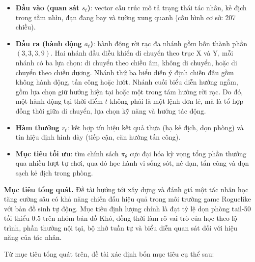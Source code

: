 \begin{itemize}
    \item \textbf{Đầu vào (quan sát $s_t$)}: vector cấu trúc mô tả trạng thái tác nhân, kẻ địch trong tầm nhìn, đạn đang bay và tường xung quanh (cấu hình cơ sở: 207 chiều).
    \item \textbf{Đầu ra (hành động $a_t$)}: hành động rời rạc đa nhánh gồm bốn thành phần $(3,3,3,9)$. Hai nhánh đầu điều khiển di chuyển theo trục X và Y, mỗi nhánh có ba lựa chọn: di chuyển theo chiều âm, không di chuyển, hoặc di chuyển theo chiều dương. Nhánh thứ ba biểu diễn ý định chiến đấu gồm không hành động, tấn công hoặc lướt. Nhánh cuối biểu diễn hướng ngắm, gồm lựa chọn giữ hướng hiện tại hoặc một trong tám hướng rời rạc. Do đó, một hành động tại thời điểm $t$ không phải là một lệnh đơn lẻ, mà là tổ hợp đồng thời giữa di chuyển, lựa chọn kỹ năng và hướng tác động.
    \item \textbf{Hàm thưởng $r_t$}: kết hợp tín hiệu kết quả thưa (hạ kẻ địch, dọn phòng) và tín hiệu định hình dày (tiếp cận, căn hướng tấn công).
    \item \textbf{Mục tiêu tối ưu}: tìm chính sách $\pi_\theta$ cực đại hóa kỳ vọng tổng phần thưởng qua nhiều lượt tự chơi, qua đó học hành vi sống sót, né đạn, tấn công và dọn sạch kẻ địch trong phòng.
\end{itemize}

\vspace{0.5cm}

\textbf{Mục tiêu tổng quát.} Đề tài hướng tới xây dựng và đánh giá một tác nhân học tăng cường sâu có khả năng chiến đấu hiệu quả trong môi trường game Roguelike với bản đồ sinh tự động. Mục tiêu định lượng chính là đạt tỷ lệ dọn phòng tail-50 tối thiểu $0.5$ trên nhóm bản đồ Khó, đồng thời làm rõ vai trò của học theo lộ trình, phần thưởng nội tại, bộ nhớ tuần tự và biểu diễn quan sát đối với hiệu năng của tác nhân.

Từ mục tiêu tổng quát trên, đề tài xác định bốn mục tiêu cụ thể sau:

